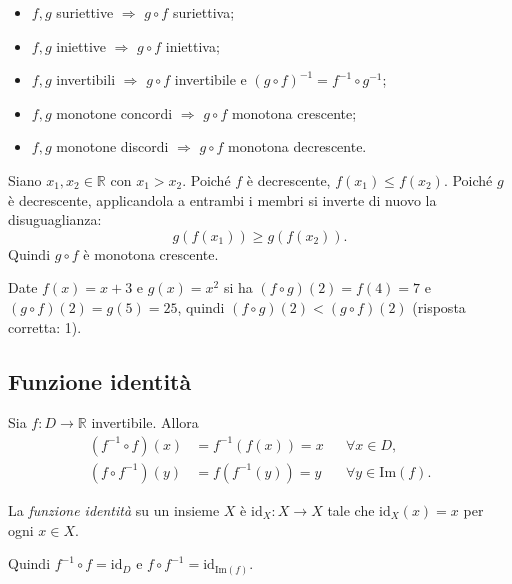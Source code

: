 \documentclass[11pt,a4paper]{article}
\begin{document}
\begin{proprieta}
\leavevmode
\begin{itemize}
    \item $f, g$ suriettive $\Rightarrow$ $g \circ f$ suriettiva;
    \item $f, g$ iniettive $\Rightarrow$ $g \circ f$ iniettiva;
    \item $f, g$ invertibili $\Rightarrow$ $g \circ f$ invertibile e $(g \circ f)^{-1} = f^{-1} \circ g^{-1}$;
    \item $f, g$ monotone concordi $\Rightarrow$ $g \circ f$ monotona crescente;
    \item $f, g$ monotone discordi $\Rightarrow$ $g \circ f$ monotona decrescente.
\end{itemize}
\end{proprieta}

\begin{esempio}
Siano $x_1, x_2 \in \mathbb{R}$ con $x_1 > x_2$. Poiché $f$ è decrescente, $f(x_1) \leq f(x_2)$. Poiché $g$ è decrescente, applicandola a entrambi i membri si inverte di nuovo la disuguaglianza:
\[
g(f(x_1)) \geq g(f(x_2)).
\]
Quindi $g \circ f$ è monotona crescente.
\end{esempio}

\begin{esempio}[Test]
Date $f(x) = x + 3$ e $g(x) = x^2$ si ha $(f \circ g)(2) = f(4) = 7$ e $(g \circ f)(2) = g(5) = 25$, quindi $(f \circ g)(2) < (g \circ f)(2)$ (risposta corretta: 1).
\end{esempio}

\subsection{Funzione identità}

Sia $f : D \to \mathbb{R}$ invertibile. Allora
\begin{align*}
(f^{-1} \circ f)(x) &= f^{-1}(f(x)) = x && \forall x \in D, \\
(f \circ f^{-1})(y) &= f(f^{-1}(y)) = y && \forall y \in \mathrm{Im}(f).
\end{align*}

\begin{definizione}
La \emph{funzione identità} su un insieme $X$ è $\mathrm{id}_X : X \to X$ tale che $\mathrm{id}_X(x) = x$ per ogni $x \in X$.
\end{definizione}

Quindi $f^{-1} \circ f = \mathrm{id}_D$ e $f \circ f^{-1} = \mathrm{id}_{\mathrm{Im}(f)}$.
\end{document}
